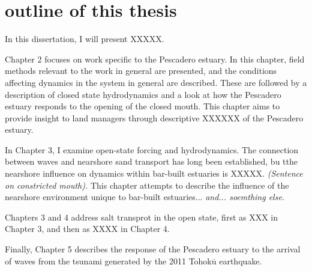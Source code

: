 \section{outline of this thesis}

In this dissertation, I will present XXXXX.

Chapter 2 focuses on work specific to the Pescadero estuary. In this chapter, field methods relevant to the work in general are presented, and the conditions affecting dynamics in the system in general are described. These are followed by a description of closed state hydrodynamics and a look at how the Pescadero estuary responds to the opening of the closed mouth. This chapter aims to provide insight to land managers through descriptive XXXXXX of the Pescadero estuary.

In Chapter 3, I examine open-state forcing and hydrodynamics. The connection between waves and nearshore sand transport has long been established, bu tthe nearshore influence on dynamics within bar-built estuaries is XXXXX. \emph{(Sentence on constricted mouth).} This chapter attempts to describe the influence of the nearshore environment unique to bar-built estuaries... \emph{and... soemthing else}. 

Chapters 3 and 4 address salt transprot in the open state, first as XXX in Chapter 3, and then as XXXX in Chapter 4. 

Finally, Chapter 5 describes the response of the Pescadero estuary to the arrival of waves from the tsunami generated by the 2011 Tohok$\overline{\mathrm{u}}$ earthquake. 
